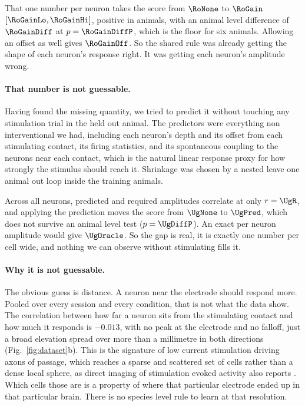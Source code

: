 \documentclass[11pt,letterpaper]{article}
\begin{document}
That one number per neuron takes the score from $\RoNone$ to $\RoGain$
$[\RoGainLo, \RoGainHi]$, positive in \RoGainPos{} animals, with an animal level
difference of $\RoGainDiff$ at $p = \RoGainDiffP$, which is the floor for six animals.
Allowing an offset as well gives $\RoGainOff$. So the shared rule was already getting
the shape of each neuron's response right. It was getting each neuron's amplitude
wrong.

\paragraph{That number is not guessable.}
Having found the missing quantity, we tried to predict it without touching any
stimulation trial in the held out animal. The predictors were everything
non interventional we had, including each neuron's depth and its offset from each
stimulating contact, its firing statistics, and its spontaneous coupling to the
neurons near each contact, which is the natural linear response proxy for how strongly
the stimulus should reach it. Shrinkage was chosen by a nested leave one animal out
loop inside the training animals.

Across all \NUnits{} neurons, predicted and required amplitudes correlate at only
$r = \UgR$, and applying the prediction moves the score from $\UgNone$ to $\UgPred$,
which does not survive an animal level test ($p = \UgDiffP$). An exact per neuron
amplitude would give $\UgOracle$. So the gap is real, it is exactly one number per
cell wide, and nothing we can observe without stimulating fills it.

\paragraph{Why it is not guessable.}
The obvious guess is distance. A neuron near the electrode should respond more. Pooled
over every session and every condition, that is not what the data show. The
correlation between how far a neuron sits from the stimulating contact and how much it
responds is $-0.013$, with no peak at the electrode and no falloff, just a broad
elevation spread over more than a millimetre in both directions
(Fig.~\ref{fig:dataset}b). This is the signature of low current stimulation driving
axons of passage, which reaches a sparse and scattered set of cells rather than a dense
local sphere, as direct imaging of stimulation evoked activity also reports
\citep{histed}. Which cells those are is a property of where that particular electrode
ended up in that particular brain. There is no species level rule to learn at that
resolution.
\end{document}

